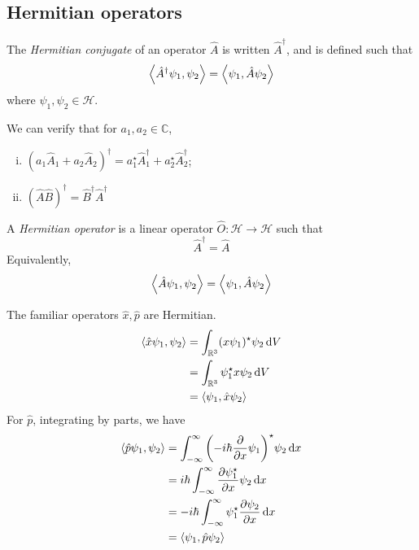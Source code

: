 \subsection{Hermitian operators}
\begin{definition}
	The \textit{Hermitian conjugate} of an operator \( \hat A \) is written \( \hat A^\dagger \), and is defined such that
	\[
		\left\langle{\hat A^\dagger \psi_1, \psi_2}\right\rangle = \left\langle{\psi_1, \hat A \psi_2}\right\rangle
	\]
	where \( \psi_1, \psi_2 \in \mathcal H \).
\end{definition}
\noindent We can verify that for \( a_1, a_2 \in \mathbb C \),
\begin{enumerate}[(i)]
	\item \( (a_1 \hat A_1 + a_2 \hat A_2 )^\dagger = a_1^\star \hat A_1^\dagger + a_2^\star \hat A_2^\dagger \);
	\item \( (\hat A \hat B)^\dagger = \hat B^\dagger \hat A^\dagger \)
\end{enumerate}
\begin{definition}
	A \textit{Hermitian operator} is a linear operator \( \hat O \colon \mathcal H \to \mathcal H \) such that
	\[
		\hat A^\dagger = \hat A
	\]
	Equivalently,
	\[
		\left\langle{\hat A \psi_1, \psi_2}\right\rangle = \left\langle{\psi_1, \hat A \psi_2}\right\rangle
	\]
\end{definition}
\begin{example}
	The familiar operators \( \hat x, \hat p \) are Hermitian.
	\begin{align*}
		\left\langle{\hat x \psi_1, \psi_2}\right\rangle & = \int_{\mathbb R^3} (x \psi_1)^\star \psi_2 \dd{V} \\
		                              & = \int_{\mathbb R^3} \psi_1^\star x \psi_2 \dd{V}   \\
		                              & = \left\langle{\psi_1, \hat x \psi_2}\right\rangle
	\end{align*}
	For \( \hat p \), integrating by parts, we have
	\begin{align*}
		\left\langle{\hat p \psi_1, \psi_2}\right\rangle & = \int_{-\infty}^\infty \qty(-i\hbar \pdv{x} \psi_1)^\star \psi_2 \dd{x} \\
		                              & = i \hbar \int_{-\infty}^\infty \pdv{\psi_1^\star}{x} \psi_2 \dd{x}      \\
		                              & = -i\hbar \int_{-\infty}^\infty \psi_1^\star \pdv{\psi_2}{x} \dd{x}      \\
		                              & = \left\langle{\psi_1, \hat p \psi_2}\right\rangle
	\end{align*}
\end{example}

